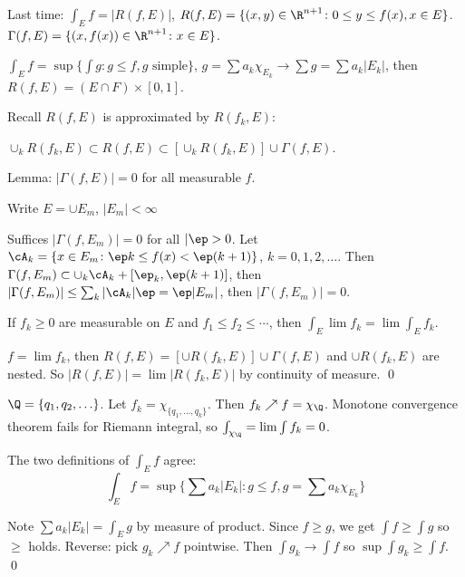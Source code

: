 Last time: $\int_E f= |R(f,E)|$, $R(f,E)= \{ (x,y) \in \R^{n+1} \colon 0 \leq y \leq f(x), x \in E\}$. $\Gamma(f,E)= \{ (x,f(x)) \in \R^{n+1} \colon x \in E\}$. 

$\int_E f= \sup \{ \int g \colon g \leq f, g \text{ simple}\}$, $g= \sum a_k \chi_{E_k} \to \sum g= \sum a_k |E_k|$, then $R(f,E)= (E \cap F) \times [0,1]$. 

Recall $R(f,E)$ is approximated by $R(f_k,E)$:

$\cup_k R(f_k,E) \subset R(f,E) \subset \left[ \cup_k R(f_k,E) \right] \cup \Gamma(f,E)$.


Lemma: $|\Gamma(f,E)|=0$ for all measurable $f$.

\pf Write $E= \cup E_m$, $|E_m|<\infty$

Suffices $|\Gamma(f,E_m)|=0$ for all $|\ep>0$. Let $\cA_k=\{ x \in E_m \colon \ep k \leq f(x)< \ep(k+1)\}$, $k=0,1,2,\ldots$. Then $\Gamma(f,E_m) \subset \cup_k \cA_k + [\ep_k,\ep(k+1)]$, then $|\Gamma(f,E_m)| \leq \sum_k |\cA_k| \ep = \ep |E_m|$, then $|\Gamma(f,E_m)|=0$. 



\begin{thm}
If $f_k \geq 0$ are measurable on $E$ and $f_1 \leq f_2 \leq \cdots$, then $\int_E \lim f_k = \lim \int_E f_k$.
\end{thm}

\pf $f= \lim f_k$, then $R(f,E)= [\cup R(f_k,E)] \cup \Gamma(f,E)$ and $\cup R(f_k,E)$ are nested. So $|R(f,E)|= \lim |R(f_k,E)|$ by continuity of measure. \qed \\


\begin{ex}
$\Q=\{q_1,q_2,\ldots\}$. Let $f_k= \chi_{\{q_1,\ldots,q_k\}}$. Then $f_k \nearrow f= \chi_\Q$. Monotone convergence theorem fails for Riemann integral, so $\int_{\chi_\Q}= \lim \int f_k=0$. 
\end{ex}



\begin{thm}
The two definitions of $\int_E f$ agree:
	\[
	\int_E f= \sup\{ \sum a_k |E_k| \colon g \leq f, g= \sum a_k \chi_{E_k}\}
	\]
\end{thm}

\pf Note $\sum a_k |E_k|= \int_E g$ by measure of product. Since $f \geq g$, we get $\int f \geq \int g$ so $\geq$ holds. Reverse: pick $g_k \nearrow f$ pointwise. Then $\int g_k \to \int f$ so $\sup \int g_k \geq \int f$. \qed \\



